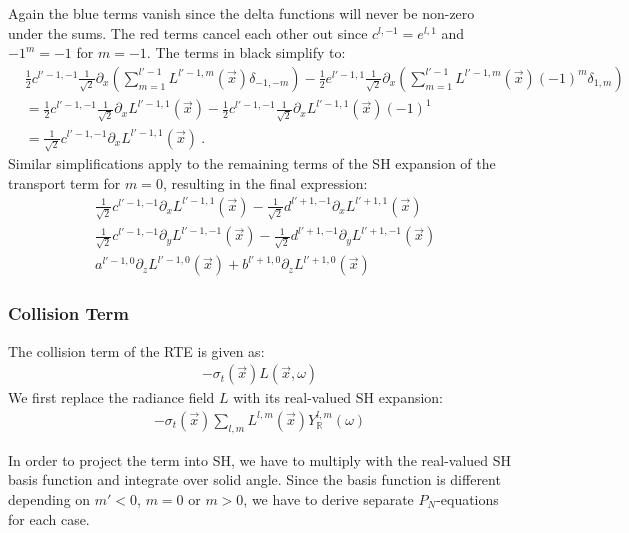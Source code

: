 \documentclass{egpubl}
\newcommand{\SHBR}{Y_{\mathbb{R}}} %
\begin{document}
Again the blue terms vanish since the delta functions will never be non-zero under the sums. The red terms cancel each other out since $c^{l,-1}=e^{l,1}$ and $-1^m=-1$ for $m=-1$. The terms in black simplify to:
\begin{align*}
&
\frac{1}{2}c^{{l'-1,-1}}\frac{1}{\sqrt{2}}\partial_x\left(\sum_{m=1}^{l'-1}{L^{{l'-1,m}}\left (\vec{x} \right )\delta_{-1,-m}}\right)
-\frac{1}{2}e^{{l'-1,1}}\frac{1}{\sqrt{2}}\partial_x\left(\sum_{m=1}^{l'-1}{L^{{l'-1,m}}\left (\vec{x} \right )\left({-1}\right)^{m}\delta_{1,m}}\right)
\\&
=
\frac{1}{2}c^{{l'-1,-1}}\frac{1}{\sqrt{2}}\partial_xL^{{l'-1,1}}\left (\vec{x} \right )
-\frac{1}{2}c^{{l'-1,-1}}\frac{1}{\sqrt{2}}\partial_xL^{{l'-1,1}}\left (\vec{x} \right )\left({-1}\right)^{1}
\\&
=
\frac{1}{\sqrt{2}}c^{{l'-1,-1}}\partial_xL^{{l'-1,1}}\left (\vec{x} \right ) \ .
\end{align*}
Similar simplifications apply to the remaining terms of the SH expansion of the transport term for $m=0$, resulting in the final expression:
\begin{align*}
&
\frac{1}{\sqrt{2}}c^{{l'-1,-1}}\partial_x L^{{l'-1,1}}\left (\vec{x} \right )
-\frac{1}{\sqrt{2}}d^{{l'+1,-1}}\partial_x L^{{l'+1,1}}\left (\vec{x} \right )
\\&
\frac{1}{\sqrt{2}}c^{{l'-1,-1}}\partial_y L^{{l'-1,-1}}\left (\vec{x} \right )
-\frac{1}{\sqrt{2}}d^{{l'+1,-1}}\partial_y L^{{l'+1,-1}}\left (\vec{x} \right )
\\&
a^{{l'-1,0}}\partial_z L^{{l'-1,0}}\left (\vec{x} \right)
+b^{{l'+1,0}}\partial_z L^{{l'+1,0}}\left (\vec{x} \right)
\end{align*}


\subsubsection{Collision Term}

The collision term of the RTE is given as:
\begin{align*}
-\sigma_t\left(\vec{x}\right)L\left(\vec{x}, \omega\right)
\end{align*}
We first replace the radiance field $L$ with its real-valued SH expansion:
\begin{align*}
-\sigma_t\left(\vec{x}\right)
\sum_{l,m}
{
L^{l,m}\left(\vec{x}\right )\SHBR^{l,m}\left(\omega\right)
}
\end{align*}

In order to project the term into SH, we have to multiply with the real-valued SH basis function and integrate over solid angle. Since the basis function is different depending on $m'<0$, $m=0$ or $m>0$, we have to derive separate $P_N$-equations for each case.
\end{document}
